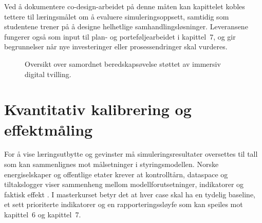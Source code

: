 Ved å dokumentere co-design-arbeidet på denne måten kan kapittelet kobles tettere til læringsmålet om å evaluere simuleringsoppsett, samtidig som studentene trener på å designe helhetlige samhandlingsløsninger. Leveransene fungerer også som input til plan- og porteføljearbeidet i kapittel~7, og gir begrunnelser når nye investeringer eller prosessendringer skal vurderes.

\begin{figure}[htbp]
    \centering
    \caption{Oversikt over samordnet beredskapsøvelse støttet av immersiv digital tvilling.}
    \label{fig:kap04-beredskap-case}
\end{figure}

\section{Kvantitativ kalibrering og effektmåling}
For å vise læringsutbytte og gevinster må simuleringsresultater oversettes til tall som kan sammenlignes mot målsetninger i styringsmodellen. Norske energiselskaper og offentlige etater krever at kontrolltårn, dataspace og tiltakslogger viser sammenheng mellom modellforutsetninger, indikatorer og faktisk effekt \citep{energinorge2023beredskap,statnett2024kontrolltarn}. I masterkurset betyr det at hver case skal ha en tydelig baseline, et sett prioriterte indikatorer og en rapporteringssløyfe som kan speiles mot kapittel~6 og kapittel~7.


